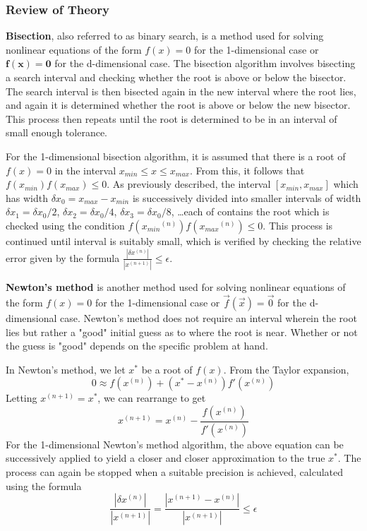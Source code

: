 \documentclass[10pt]{article}
\begin{document}
\subsubsection*{Review of Theory}

\textbf{Bisection}, also referred to as binary search, is a method used for solving nonlinear equations of the 
form $f(x)=0$ for the 1-dimensional case or $\mathbf{f}(\mathbf{x})=\mathbf{0}$ for the d-dimensional case. The
bisection algorithm involves bisecting a search interval and checking whether the root is above or 
below the bisector. The search interval is then bisected again in the new interval where the root lies, 
and again it is determined whether the root is above or below the new bisector. This process then repeats
until the root is determined to be in an interval of small enough tolerance. 

For the 1-dimensional bisection algorithm, it is assumed that there is a root of $f(x)=0$ in the interval
$x_{min} \leq x \leq x_{max}$. From this, it follows that $f(x_{min})f(x_{max}) \leq 0$. As previously 
described, the interval $[x_{min}, x_{max}]$ which has width $\delta x_0 = x_{max} - x_{min}$ is
successively divided into smaller intervals of width $\delta x_1 = \delta x_0/2$, 
$\delta x_2 = \delta x_0/4$, $\delta x_3 = \delta x_0/8$, \ldots each of contains the root which is 
checked using the condition $f({x_{min}}^{(n)})f({x_{max}}^{(n)}) \leq 0$. This process is continued until 
interval is suitably small, which is verified by checking the relative error given by the formula
$\frac{| \delta x^{(n)} |}{| x^{(n+1)} |} \leq \epsilon$.

\textbf{Newton's method} is another method used for solving nonlinear equations of the form $f(x)=0$ for the 
1-dimensional case or $\vec{f}(\vec{x})=\vec{0}$ for the d-dimensional case. Newton's method does not 
require an interval wherein the root lies but rather a "good" initial guess as to where the root is near.
Whether or not the guess is "good" depends on the specific problem at hand.

In Newton's method, we let $x^*$ be a root of $f(x)$. From the Taylor expansion,
$$0 \approx f(x^{(n)}) + (x^* - x^{(n)})f'(x^{(n)})$$
Letting $x^{(n+1)} = x^*$, we can rearrange to get
$$x^{(n+1)} = x^{(n)} - \frac{f(x^{(n)})}{f'(x^{(n)})}$$
For the 1-dimensional Newton's method algorithm, the above equation can be successively applied to yield a 
closer and closer approximation to the true $x^*$. The process can again be stopped when a suitable precision
is achieved, calculated using the formula 
$$\frac{| \delta x^{(n)} |}{| x^{(n+1)} |} = \frac{| x^{(n+1)}-x^{(n)} |}{| x^{(n+1)} |} \leq \epsilon$$
\end{document}
